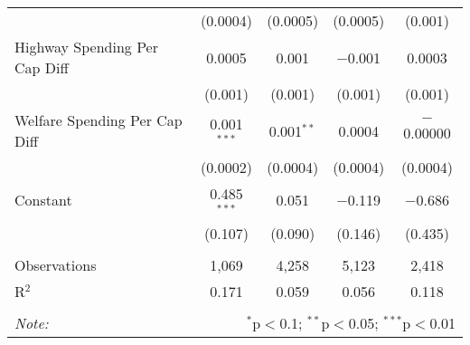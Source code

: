 \begin{table}[!htbp]
\begin{tabular}{@{\extracolsep{5pt}}lcccc}
  & (0.0004) & (0.0005) & (0.0005) & (0.001) \\ 
  Highway Spending Per Cap Diff & 0.0005 & 0.001 & $-$0.001 & 0.0003 \\ 
  & (0.001) & (0.001) & (0.001) & (0.001) \\ 
  Welfare Spending Per Cap Diff & 0.001$^{***}$ & 0.001$^{**}$ & 0.0004 & $-$0.00000 \\ 
  & (0.0002) & (0.0004) & (0.0004) & (0.0004) \\ 
  Constant & 0.485$^{***}$ & 0.051 & $-$0.119 & $-$0.686 \\ 
  & (0.107) & (0.090) & (0.146) & (0.435) \\ 
 \hline \\[-1.8ex] 
Observations & 1,069 & 4,258 & 5,123 & 2,418 \\ 
R$^{2}$ & 0.171 & 0.059 & 0.056 & 0.118 \\ 
\hline 
\hline \\[-1.8ex] 
\textit{Note:}  & \multicolumn{4}{r}{$^{*}$p$<$0.1; $^{**}$p$<$0.05; $^{***}$p$<$0.01} \\ 
\end{tabular} 
\end{table} 
